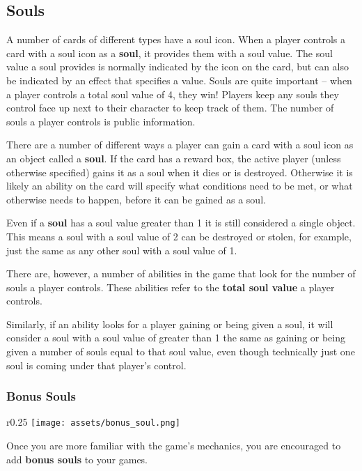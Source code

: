 \documentclass[10pt, a4paper, twoside]{article} %
\begin{document}
    \subsection{Souls}
    A number of cards of different types have a soul icon. When a player controls a card with a soul icon as a \textbf{soul}, it provides them with a soul value. The soul value a soul provides is normally indicated by the icon on the card, but can also be indicated by an effect that specifies a value. Souls are quite important – when a player controls a total soul value of 4, they win! Players keep any souls they control face up next to their character to keep track of them. The number of souls a player controls is public information.

    There are a number of different ways a player can gain a card with a soul icon as an object called a \textbf{soul}. If the card has a reward box, the active player (unless otherwise specified) gains it as a soul when it dies or is destroyed. Otherwise it is likely an ability on the card will specify what conditions need to be met, or what otherwise needs to happen, before it can be gained as a soul.

    Even if a \textbf{soul} has a soul value greater than 1 it is still considered a single object. This means a soul with a soul value of 2 can be destroyed or stolen, for example, just the same as any other soul with a soul value of 1.

    There are, however, a number of abilities in the game that look for the number of souls a player controls. These abilities refer to the \textbf{total soul value} a player controls.

    Similarly, if an ability looks for a player gaining or being given a soul, it will consider a soul with a soul value of greater than 1 the same as gaining or being given a number of souls equal to that soul value, even though technically just one soul is coming under that player’s control.

    \subsubsection{Bonus Souls}
    \begin{wrapfigure}{r}{0.25\textwidth}
        \centering
        \texttt{[image: assets/bonus\_soul.png]}
    \end{wrapfigure}
    Once you are more familiar with the game’s mechanics, you are encouraged to add \textbf{bonus souls} to your games.
\end{document}
